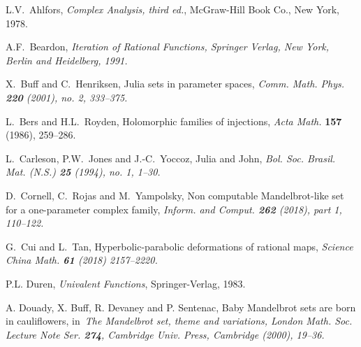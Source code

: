 \documentclass[12pt, reqno, a4paper]{amsart}
\theoremstyle{plain}
\theoremstyle{definition}
\begin{document}
\maketitle













\begin{thebibliography}{99}

\parskip=3pt

L.V.~Ahlfors, 
{\it Complex Analysis, third ed.},
McGraw-Hill Book Co., New York, 1978.

A.F.~Beardon, \it
Iteration of Rational Functions\rm, 
Springer Verlag, New York, Berlin and Heidelberg, 1991.


X.~Buff and C.~Henriksen, Julia sets in parameter spaces, \it 
Comm. Math. Phys. \rm {\bf 220} (2001), no. 2, 333--375.


L.~Bers and H.L.~Royden,
Holomorphic families of injections, 
{\it Acta Math.} {\bf 157} (1986), 259--286.




L.~Carleson, P.W.~Jones and J.-C.~Yoccoz, 
Julia and John, \it
Bol. Soc. Brasil. Mat. (N.S.) {\bf 25} \rm (1994), no. 1, 1--30. 




D.~Cornell, C.~Rojas and M.~Yampolsky, 
Non computable Mandelbrot-like set for a one-parameter complex family, \it
Inform. and Comput. {\bf 262} \rm (2018), part 1, 110--122. 


G.~Cui and L.~Tan, 
Hyperbolic-parabolic deformations of rational maps, \it
Science China Math. {\bf 61} \rm (2018) 2157--2220.


P.L. Duren,
{\it Univalent Functions}, 
Springer-Verlag, 1983.


A. Douady, X. Buff, R. Devaney and P. Sentenac, 
Baby Mandelbrot sets are born in cauliflowers, 
in\it \ The Mandelbrot set, theme and variations\rm, London Math. Soc. Lecture 
Note Ser. {\bf 274}, Cambridge Univ. Press, Cambridge (2000), 19--36.



\end{thebibliography}
\end{document}

